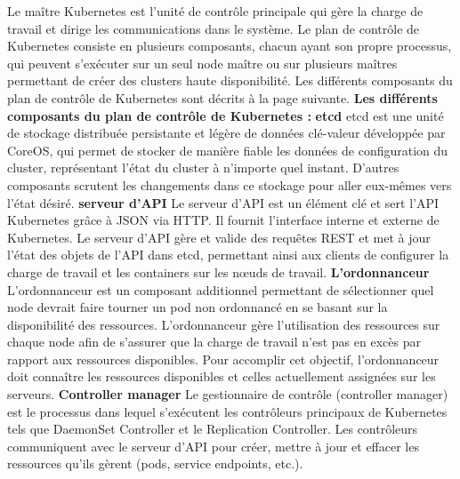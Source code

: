 \documentclass{article}
\begin{document}
Le maître Kubernetes est l'unité de contrôle principale qui gère la charge de travail et dirige les communications dans le système. Le plan de contrôle de Kubernetes consiste en plusieurs composants, chacun ayant son propre processus, qui peuvent s'exécuter sur un seul node maître ou sur plusieurs maîtres permettant de créer des clusters haute disponibilité. Les différents composants du plan de contrôle de Kubernetes sont décrits à la page suivante.
\newpage
\textbf{Les différents composants du plan de contrôle de Kubernetes : }
\newline
\newline
\textbf{etcd}
\newline
\newline
etcd est une unité de stockage distribuée persistante et légère de données clé-valeur développée par CoreOS, qui permet de stocker de manière fiable les données de configuration du cluster, représentant l'état du cluster à n'importe quel instant. D'autres composants scrutent les changements dans ce stockage pour aller eux-mêmes vers l'état désiré.
\newline
\newline
\textbf{serveur d'API}
\newline
\newline
Le serveur d'API est un élément clé et sert l'API Kubernetes grâce à JSON via HTTP. Il fournit l'interface interne et externe de Kubernetes. Le serveur d'API gère et valide des requêtes REST et met à jour l'état des objets de l'API dans etcd, permettant ainsi aux clients de configurer la charge de travail et les containers sur les nœuds de travail.
\newline
\newline
\textbf{L'ordonnanceur}
\newline
\newline
L'ordonnanceur est un composant additionnel permettant de sélectionner quel node devrait faire tourner un pod non ordonnancé en se basant sur la disponibilité des ressources. L'ordonnanceur gère l'utilisation des ressources sur chaque node afin de s'assurer que la charge de travail n'est pas en excès par rapport aux ressources disponibles. Pour accomplir cet objectif, l'ordonnanceur doit connaître les ressources disponibles et celles actuellement assignées sur les serveurs.
\newline
\newline
\textbf{Controller manager}
\newline
\newline
Le gestionnaire de contrôle (controller manager) est le processus dans lequel s'exécutent les contrôleurs principaux de Kubernetes tels que DaemonSet Controller et le Replication Controller. Les contrôleurs communiquent avec le serveur d'API pour créer, mettre à jour et effacer les ressources qu'ils gèrent (pods, service endpoints, etc.).
\end{document}
